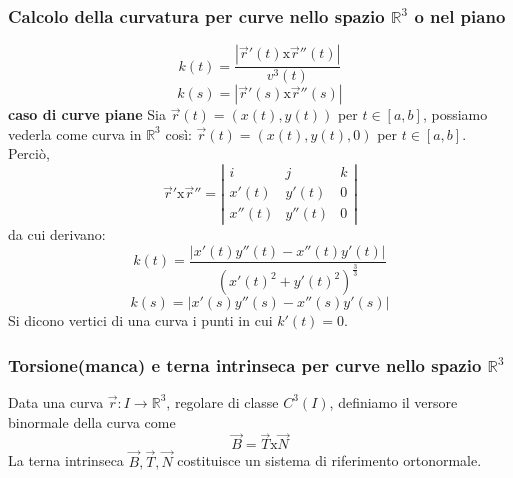 \subsubsection{Calcolo della curvatura per curve nello spazio $\mathbb{R}^3$ o nel piano}
\[
    k(t) = \frac{|\vec{r}'(t) \text{x} \vec{r}''(t)|}{v^3(t)}
\]
\[
    k(s) = |\vec{r}'(s) \text{x} \vec{r}''(s)|
\]
\newline
\textbf{caso di curve piane}\newline
Sia $\vec{r}(t) =(x(t), y(t))$ per $t \in[a,b]$, possiamo vederla come curva in $\mathbb{R}^3$ così: $\vec{r}(t) = (x(t), y(t), 0)$ per $t \in[a,b]$.\newline
Perciò,
\[
    \vec{r}' \text{x} \vec{r}'' =\left|\begin{matrix}
        i \;\;& j \;\;& k \\
        x'(t) & y'(t) & 0\\
        x''(t) & y''(t) & 0
    \end{matrix} \right|
\]
da cui derivano:
\[
    k(t) = \frac{|x'(t)y''(t) - x''(t) y'(t)|}{(x'(t)^2 + y'(t)^2)^{\frac{3}{3}}}
\]
\[
    k(s) = |x'(s) y''(s) - x''(s) y'(s)|
\]
\newline
\newline
Si dicono vertici di una curva i punti in cui $k'(t) = 0$.
\subsubsection{Torsione(manca) e terna intrinseca per curve nello spazio $\mathbb{R}^3$}
Data una curva $\vec{r} : I \rightarrow \mathbb{R}^3$, regolare di classe $C^3(I)$, definiamo il versore binormale della curva come
\[
    \vec{B} = \vec{T} \text{x} \vec{N}
\]
La terna intrinseca $\vec{B}, \vec{T}, \vec{N}$ costituisce un sistema di riferimento ortonormale.
